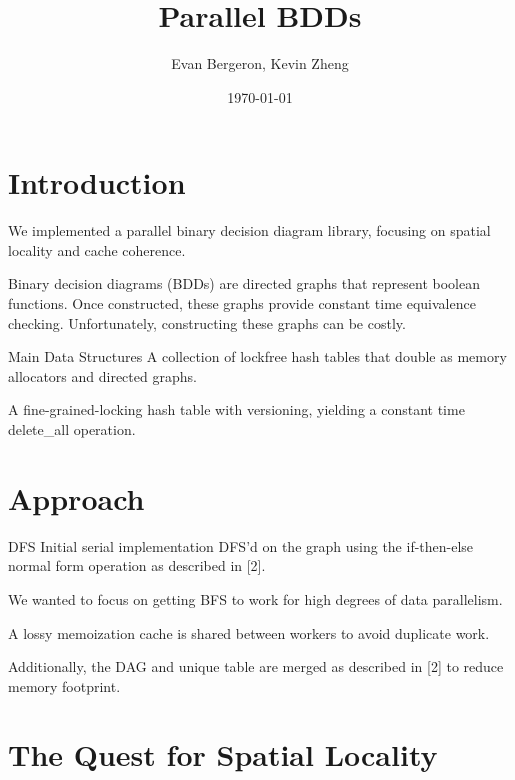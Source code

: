\documentclass{beamer}
\title{Parallel BDDs}
\date{\today}
\author{Evan Bergeron, Kevin Zheng}
\begin{document}
\maketitle

\section{Introduction}

\begin{frame}
We implemented a parallel binary decision diagram library, focusing on spatial locality and cache coherence.
\end{frame}

\begin{frame}
Binary decision diagrams (BDDs) are directed graphs that represent boolean functions. Once constructed, these graphs provide constant time equivalence checking. Unfortunately, constructing these graphs can be costly.
\end{frame}

\begin{frame}{Main Data Structures}
A collection of lockfree hash tables that double as memory allocators and directed graphs.

A fine-grained-locking hash table with versioning, yielding a constant time delete_all operation.
\end{frame}

\section{Approach}

\begin{frame}{DFS}
Initial serial implementation DFS'd on the graph using the if-then-else normal form operation as described in [2].

We wanted to focus on getting BFS to work for high degrees of data parallelism.
\end{frame}

\begin{frame}
A lossy memoization cache is shared between workers to avoid duplicate work.

Additionally, the DAG and unique table are merged as described in [2] to reduce memory footprint.
\end{frame}

\section{The Quest for Spatial Locality}
\end{document}
